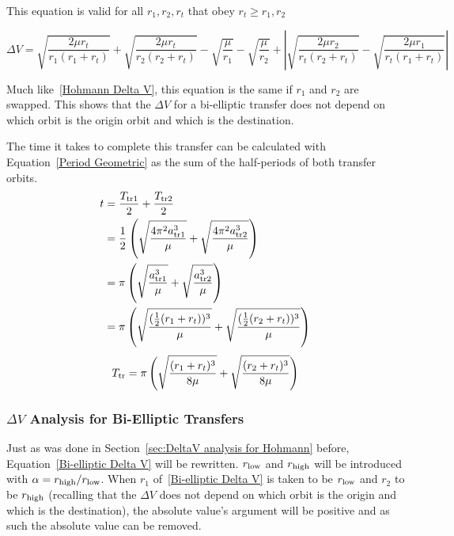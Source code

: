\documentclass[../basicOrbitalDynamics.tex]{subfiles}
\begin{document}
This equation is valid for all $r_1, r_2, r_t$ that obey $r_t\geq r_1,r_2$

\begin{equation}\label{Bi-elliptic Delta V}
    \Delta V = \sqrt{\frac{2\mu r_t}{r_1(r_1+r_t)}}+\sqrt{\frac{2\mu r_t}{r_2(r_2+r_t)}}-\sqrt{\frac{\mu}{r_1}}-\sqrt{\frac{\mu}{r_2}}+\left|\sqrt{\frac{2\mu r_2}{r_t(r_2+r_t)}}-\sqrt{\frac{2\mu r_1}{r_t(r_1+r_t)}}\right|
\end{equation}

Much like~\eqref{Hohmann Delta V}, this equation is the same if $r_1$ and $r_2$ are swapped. This shows that the $\Delta V$ for a bi-elliptic transfer does not depend on which orbit is the origin orbit and which is the destination.

The time it takes to complete this transfer can be calculated with Equation~\eqref{Period Geometric} as the sum of the half-periods of both transfer orbits.
\begin{align*}
    t &=\frac{{T}_\text{tr1}}{2}+\frac{{T}_\text{tr2}}{2} \\
 &=\frac{1}{2}\left(\sqrt{\frac{4\pi^2 {a}_\text{tr1}^3}{\mu}}+\sqrt{\frac{4\pi^2 {a}_\text{tr2}^3}{\mu}}\right) \\
 &=\pi\left(\sqrt{\frac{{a}_\text{tr1}^3}{\mu}}+\sqrt{\frac{{a}_\text{tr2}^3}{\mu}}\right) \\
 &=\pi\left(\sqrt{\frac{(\frac{1}{2}(r_1+r_t))^3}{\mu}}+\sqrt{\frac{(\frac{1}{2}(r_2+r_t))^3}{\mu}}\right) \\
\end{align*}
\begin{equation}\label{Bielliptic time}
    {T}_\text{tr}=\pi\left(\sqrt{\frac{(r_1+r_t)^3}{8\mu}}+\sqrt{\frac{(r_2+r_t)^3}{8\mu}}\right)
\end{equation}

\subsubsection{\texorpdfstring{$\Delta V$}{DeltaV} Analysis for Bi-Elliptic Transfers}\label{sec:DeltaV Analsysis for bi-elliptic}

Just as was done in Section~\ref{sec:DeltaV analysis for Hohmann} before, Equation~\eqref{Bi-elliptic Delta V} will be rewritten. ${r}_\text{low}$ and ${r}_\text{high}$ will be introduced with $\alpha={r}_\text{high}/{r}_\text{low}$. When $r_1$ of~\eqref{Bi-elliptic Delta V} is taken to be ${r}_\text{low}$ and $r_2$ to be ${r}_\text{high}$ (recalling that the $\Delta V$ does not depend on which orbit is the origin and which is the destination), the absolute value's argument will be positive and as such the absolute value can be removed.
\end{document}
